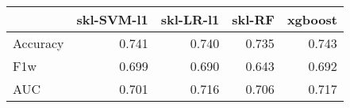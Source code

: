 \begin{tabular}{lrrrr}
\toprule
{} &  skl-SVM-l1 &  skl-LR-l1 &  skl-RF &  xgboost \\
\midrule
Accuracy &       0.741 &      0.740 &   0.735 &    0.743 \\
F1w      &       0.699 &      0.690 &   0.643 &    0.692 \\
AUC      &       0.701 &      0.716 &   0.706 &    0.717 \\
\bottomrule
\end{tabular}
